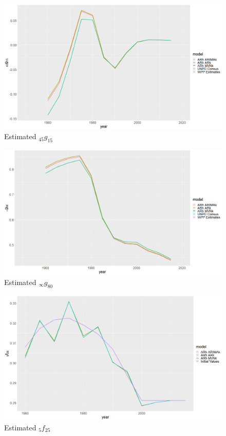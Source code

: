 \documentclass[12pt,a4paper]{article}
\begin{document}
\newpage
\begin{figure}[H]
\includegraphics[width = \linewidth]{Burkina Faso/5/15-59 mig.jpg}
\caption{Estimated $_{45}g_{15}$}
\end{figure}
\begin{figure}[H]
\includegraphics[width = \linewidth]{Burkina Faso/5/80+ mig.jpg}
\caption{Estimated $_{\infty}g_{80}$}
\end{figure}

\newpage
\begin{figure}[H]
\includegraphics[width = \linewidth]{Burkina Faso/5/25-29 fx.jpg}
\caption{Estimated $_{5}f_{25}$}
\end{figure}
\end{document}

